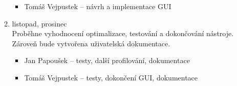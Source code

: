 \documentclass[a4paper]{article}
\begin{document}
\begin{enumerate}
\begin{enumerate}
\begin{itemize}
            \item   Tomáš Vejpustek -- návrh a implementace GUI
        \end{itemize}
	\item listopad, prosinec\\
		Proběhne vyhodnocení optimalizace, testování a dokončování nástroje.
        Zároveň bude vytvořena uživatelská dokumentace.
        \begin{itemize}
            \item   Jan Papoušek -- testy, další profilování, dokumentace
            \item   Tomáš Vejpustek -- testy, dokončení GUI, dokumentace
        \end{itemize}
	\end{enumerate}
\end{enumerate}



\end{document}
